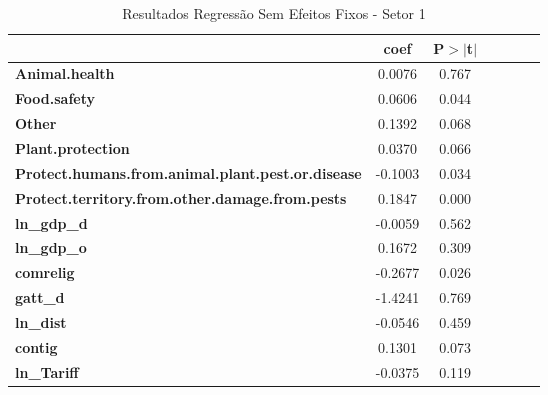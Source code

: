 \begin{table}[ht]
\begin{center}
\begin{tabular}{lcccccc}
                                                          & \textbf{coef} &\textbf{P$> |$t$|$} \\
\midrule
\textbf{Animal.health}                                    &       0.0076  &        0.767        \\
\textbf{Food.safety}                                      &       0.0606  &        0.044        \\
\textbf{Other}                                            &       0.1392  &        0.068        \\
\textbf{Plant.protection}                                 &       0.0370  &        0.066        \\
\textbf{Protect.humans.from.animal.plant.pest.or.disease} &      -0.1003  &        0.034        \\
\textbf{Protect.territory.from.other.damage.from.pests}   &       0.1847  &        0.000        \\
\textbf{ln\_gdp\_d}                                       &      -0.0059  &        0.562        \\
\textbf{ln\_gdp\_o}                                       &       0.1672  &        0.309        \\
\textbf{comrelig}                                         &      -0.2677  &        0.026        \\
\textbf{gatt\_d}                                          &      -1.4241  &        0.769        \\
\textbf{ln\_dist}                                         &      -0.0546  &        0.459        \\
\textbf{contig}                                           &       0.1301  &        0.073        \\
\textbf{ln\_Tariff}                                       &      -0.0375  &        0.119        \\
\bottomrule
\end{tabular}
\caption{Resultados Regressão Sem Efeitos Fixos - Setor 1}
\end{center}
\end{table}